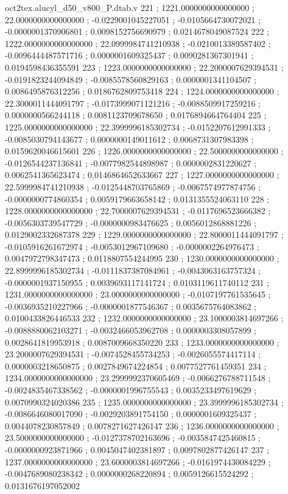 \begin{filecontents}[overwrite]{oct2tex.alucyl_d50_v800_P.dtab.v}
221 ; 1221.0000000000000000 ; 22.0000000000000000 ; -0.0229001045227051 ; -0.0105664730072021 ; -0.0000001370906801 ; 0.0098152756690979 ; 0.0214678049087524
222 ; 1222.0000000000000000 ; 22.0999984741210938 ; -0.0210013389587402 ; -0.0096444487571716 ; 0.0000001609325437 ; 0.0090281367301941 ; 0.0194598436355591
223 ; 1223.0000000000000000 ; 22.2000007629394531 ; -0.0191823244094849 ; -0.0085578560829163 ; 0.0000001341104507 ; 0.0086495876312256 ; 0.0186762809753418
224 ; 1224.0000000000000000 ; 22.3000011444091797 ; -0.0173999071121216 ; -0.0088509917259216 ; 0.0000000566244118 ; 0.0081123709678650 ; 0.0176894664764404
225 ; 1225.0000000000000000 ; 22.3999996185302734 ; -0.0152207612991333 ; -0.0085030794143677 ; 0.0000000149011612 ; 0.0068731307983398 ; 0.0159620046615601
226 ; 1226.0000000000000000 ; 22.5000000000000000 ; -0.0126544237136841 ; -0.0077982544898987 ; 0.0000002831220627 ; 0.0062541365623474 ; 0.0146864652633667
227 ; 1227.0000000000000000 ; 22.5999984741210938 ; -0.0125448703765869 ; -0.0067574977874756 ; -0.0000000774860354 ; 0.0059179663658142 ; 0.0131355524063110
228 ; 1228.0000000000000000 ; 22.7000007629394531 ; -0.0117696523666382 ; -0.0056303739547729 ; -0.0000000983476625 ; 0.0056012868881226 ; 0.0129002332687378
229 ; 1229.0000000000000000 ; 22.8000011444091797 ; -0.0105916261672974 ; -0.0053012967109680 ; -0.0000002264976473 ; 0.0047972798347473 ; 0.0118807554244995
230 ; 1230.0000000000000000 ; 22.8999996185302734 ; -0.0111837387084961 ; -0.0043063163757324 ; -0.0000001937150955 ; 0.0039693117141724 ; 0.0103119611740112
231 ; 1231.0000000000000000 ; 23.0000000000000000 ; -0.0107197761535645 ; -0.0036935210227966 ; -0.0000001877546367 ; 0.0035675764083862 ; 0.0100433826446533
232 ; 1232.0000000000000000 ; 23.1000003814697266 ; -0.0088880062103271 ; -0.0032466053962708 ; 0.0000003308057899 ; 0.0028641819953918 ; 0.0087009668350220
233 ; 1233.0000000000000000 ; 23.2000007629394531 ; -0.0074528455734253 ; -0.0026055574417114 ; 0.0000003218650875 ; 0.0027849674224854 ; 0.0077527761459351
234 ; 1234.0000000000000000 ; 23.2999992370605469 ; -0.0066276788711548 ; -0.0024835467338562 ; -0.0000001996755543 ; 0.0035233497619629 ; 0.0070990324020386
235 ; 1235.0000000000000000 ; 23.3999996185302734 ; -0.0086646080017090 ; -0.0029203891754150 ; 0.0000001609325437 ; 0.0044078230857849 ; 0.0078271627426147
236 ; 1236.0000000000000000 ; 23.5000000000000000 ; -0.0127378702163696 ; -0.0035847425460815 ; -0.0000000923871966 ; 0.0045047402381897 ; 0.0097802877426147
237 ; 1237.0000000000000000 ; 23.6000003814697266 ; -0.0161974430084229 ; -0.0047689080238342 ; 0.0000000268220894 ; 0.0059126615524292 ; 0.0131676197052002

\end{filecontents}
